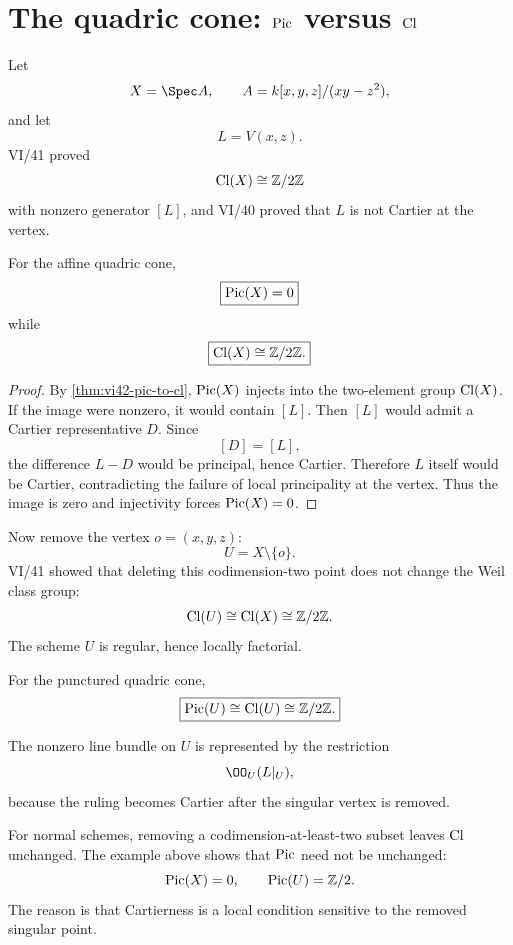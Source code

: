 \section{The quadric cone: \(\operatorname{Pic}\) versus \(\operatorname{Cl}\)}

Let
\[
  X=\Spec A,
  \qquad
  A=k[x,y,z]/(xy-z^2),
\]
and let
\[
  L=V(x,z).
\]
VI/41 proved
\[
  \operatorname{Cl}(X)\cong\mathbb Z/2\mathbb Z
\]
with nonzero generator \([L]\), and VI/40 proved that \(L\) is not Cartier at the vertex.

\begin{theorem}\label{thm:vi42-cone-pic}
For the affine quadric cone,
\[
  \boxed{\operatorname{Pic}(X)=0}
\]
while
\[
  \boxed{\operatorname{Cl}(X)\cong\mathbb Z/2\mathbb Z.}
\]
\end{theorem}

\begin{proof}
By \cref{thm:vi42-pic-to-cl}, \(\operatorname{Pic}(X)\) injects into the two-element group \(\operatorname{Cl}(X)\).  If the image were nonzero, it would contain \([L]\).  Then \([L]\) would admit a Cartier representative \(D\).  Since
\[
  [D]=[L],
\]
the difference \(L-D\) would be principal, hence Cartier.  Therefore \(L\) itself would be Cartier, contradicting the failure of local principality at the vertex.  Thus the image is zero and injectivity forces \(\operatorname{Pic}(X)=0\).
\end{proof}

Now remove the vertex \(o=(x,y,z)\):
\[
  U=X\setminus\{o\}.
\]
VI/41 showed that deleting this codimension-two point does not change the Weil class group:
\[
  \operatorname{Cl}(U)\cong\operatorname{Cl}(X)\cong\mathbb Z/2\mathbb Z.
\]
The scheme \(U\) is regular, hence locally factorial.

\begin{corollary}\label{cor:vi42-punctured-cone}
For the punctured quadric cone,
\[
  \boxed{
  \operatorname{Pic}(U)\cong\operatorname{Cl}(U)\cong\mathbb Z/2\mathbb Z.
  }
\]
\end{corollary}

The nonzero line bundle on \(U\) is represented by the restriction
\[
  \OO_U(L|_U),
\]
because the ruling becomes Cartier after the singular vertex is removed.



\begin{warning}
For normal schemes, removing a codimension-at-least-two subset leaves \(\operatorname{Cl}\) unchanged.  The example above shows that \(\operatorname{Pic}\) need not be unchanged:
\[
  \operatorname{Pic}(X)=0,
  \qquad
  \operatorname{Pic}(U)=\mathbb Z/2.
\]
The reason is that Cartierness is a local condition sensitive to the removed singular point.
\end{warning}

